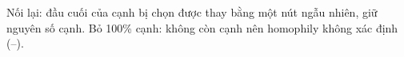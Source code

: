Nối lại: đầu cuối của cạnh bị chọn được thay bằng một nút ngẫu nhiên, giữ nguyên số cạnh. Bỏ 100\% cạnh: không còn cạnh nên homophily không xác định (--).
